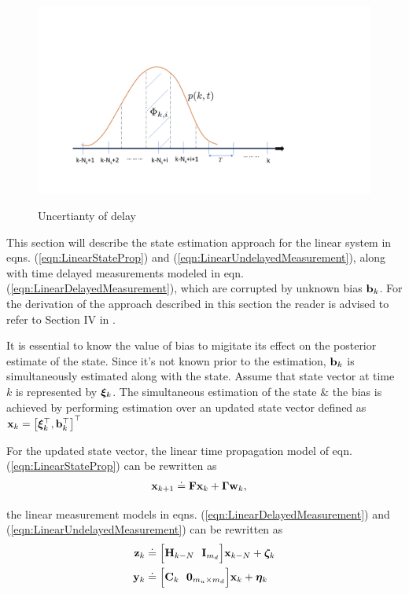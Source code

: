 \begin{figure}
	{\includegraphics[trim={2.0cm 2.5cm 6.0cm 6.0cm},clip, width=\columnwidth]{./img/delay_uncertainty.png}}
	\caption{Uncertianty of delay}
	\label{fig:delay_uncertainty}
\end{figure}

This section will describe the state estimation approach for the linear system in eqns. (\ref{eqn:LinearStateProp}) and (\ref{eqn:LinearUndelayedMeasurement}), along with time delayed measurements modeled in eqn. (\ref{eqn:LinearDelayedMeasurement}), which are corrupted by unknown bias $\mathbf{b}_k$. 
For the derivation of the approach described in this section the reader is advised to refer to \red Section IV in \cite{choi2012state}.\black

It is essential to know the value of bias to migitate its effect on the posterior estimate of the state. Since it's not known prior to the estimation, $\mathbf{b}_k$ is simultaneously estimated along with the state. 
Assume that state vector at time $k$ is represented by $\boldsymbol{\xi}_k$.
The simultaneous estimation of the state \& the bias is achieved by performing estimation over an updated state vector defined as $\mathbf{x}_k =	\big[\boldsymbol{\xi}_k^\top, \mathbf{b}_k^\top \big]^\top$


For the updated state vector, the linear time propagation model of eqn. (\ref{eqn:LinearStateProp}) can be rewritten as
\begin{align}
	\label{eqn:LinearStateProp4UpdatedState}
	\mathbf{x}_{k+1} &\doteq \mathbf{F} \mathbf{x}_k + \boldsymbol{\Gamma} \mathbf{w}_k,
\end{align}

the linear measurement models in eqns. (\ref{eqn:LinearDelayedMeasurement}) and (\ref{eqn:LinearUndelayedMeasurement}) can be rewritten as
\begin{align}
	\label{eqn:LinearDelayedMeasurement4UpdatedState}
	\mathbf{z}_k &\doteq \Big[ \mathbf{H}_{k-N} \ \ \mathbf{I}_{m_d} \Big] \mathbf{x}_{k-N} +\boldsymbol{\zeta}_k \\
	\label{eqn:LinearUndelayedMeasurement4UpdatedState}
	\mathbf{y}_k &\doteq \Big[ \mathbf{C}_k \ \ \boldsymbol{0}_{m_u \times m_d} \Big] \mathbf{x}_k + \boldsymbol{\eta}_k
\end{align}


